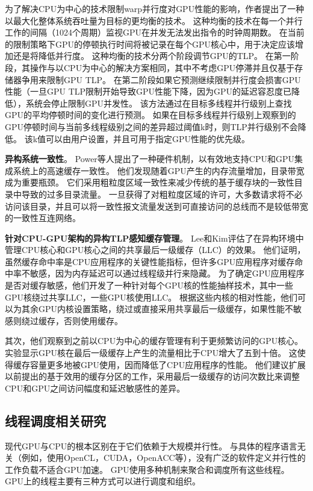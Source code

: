 为了解决CPU为中心的技术限制warp并行度对GPU性能的影响，作者提出了一种以最大化整体系统吞吐量为目标的更均衡的技术。
这种均衡的技术在每一个并行工作的间隔（1024个周期）监视GPU在并发无法发出指令的时钟周期数。
在当前的限制策略下GPU的停顿执行时间将被记录在每个GPU核心中，用于决定应该增加还是将降低并行度。
这种均衡的技术分两个阶段调节GPU的TLP。
在第一阶段，其操作与以CPU为中心的解决方案相同，其中不考虑GPU停滞并且仅基于存储器争用来限制GPU TLP。
在第二阶段如果它预测继续限制并行度会损害GPU性能（一旦GPU TLP限制开始导致GPU性能下降，因为GPU的延迟容忍度已降低），系统会停止限制GPU并发性。
该方法通过在目标多线程并行级别上查找GPU的平均停顿时间的变化进行预测。
如果在目标多线程并行级别上观察到的GPU停顿时间与当前多线程级别之间的差异超过阈值k时，则TLP并行级别不会降低。
该k值可以由用户设置，并且可用于指定GPU性能的优先级。

\textbf{异构系统一致性}。
Power等人提出了一种硬件机制，以有效地支持CPU和GPU集成系统上的高速缓存一致性。
他们发现随着GPU产生的内存流量增加，目录带宽成为重要瓶颈。
它们采用粗粒度区域一致性来减少传统的基于缓存块的一致性目录中导致的过多目录流量。 
一旦获得了对粗粒度区域的许可，大多数请求将不必访问该目录，并且可以将一致性报文流量发送到可直接访问的总线而不是较低带宽的一致性互连网络。

\textbf{针对CPU-GPU架构的异构TLP感知缓存管理}。
Lee和Kim评估了在异构环境中管理CPU核心和GPU核心之间的共享最后一级缓存（LLC）的效果。
他们证明，虽然缓存命中率是CPU应用程序的关键性能指标，但许多GPU应用程序对缓存命中率不敏感，因为内存延迟可以通过线程级并行来隐藏。
为了确定GPU应用程序是否对缓存敏感，他们开发了一种针对每个GPU核的性能抽样技术，其中一些GPU核绕过共享LLC，一些GPU核使用LLC。
根据这些内核的相对性能，他们可以为其余GPU内核设置策略，绕过或直接采用共享最后一级缓存，如果性能不敏感则绕过缓存，否则使用缓存。

其次，他们观察到之前以CPU为中心的缓存管理有利于更频繁访问的GPU核心。
实验显示GPU核在最后一级缓存上产生的流量相比于CPU增大了五到十倍。
这使得缓存容量更多地被GPU使用，因而降低了CPU应用程序的性能。
他们建议扩展以前提出的基于效用的缓存分区的工作，采用最后一级缓存的访问次数比来调整CPU和GPU之间访问幅度和延迟敏感性的差异。

\subsection{线程调度相关研究}
现代GPU与CPU的根本区别在于它们依赖于大规模并行性。 与具体的程序语言无关（例如，使用OpenCL，CUDA，OpenACC等），没有广泛的软件定义并行性的工作负载不适合GPU加速。 
GPU使用多种机制来聚合和调度所有这些线程。 
GPU上的线程主要有三种方式可以进行调度和组织。

